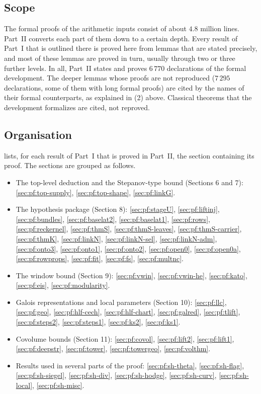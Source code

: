\subsection{Scope}\label{sec:pf:intro:scope}
The formal proofs of the arithmetic inputs consist of about $4.8$ million lines. Part~II converts each part
of them down to a certain depth. Every result of Part~I that is outlined there is proved here from lemmas
that are stated precisely, and most of these lemmas are proved in turn, usually through two or three
further levels. In all, Part~II states and proves $6\,770$ declarations of the formal development. The
deeper lemmas whose proofs are not reproduced ($7\,295$ declarations, some of them with long formal proofs)
are cited by the names of their formal counterparts, as explained in (2) above. Classical
theorems that the development formalizes are cited, not reproved.

\subsection{Organisation}\label{sec:pf:intro:org}
 lists, for each result of Part~I that is proved in Part~II, the section containing its proof.
The sections are grouped as follows.
\begin{itemize}
\item The top-level deduction and the Stepanov-type bound (Sections 6 and 7): \cref{sec:pf:top-supply}, \cref{sec:pf:top-shape}, \cref{sec:pf:linkG}.
\item The hypothesis package (Section 8): \cref{sec:pf:stageU}, \cref{sec:pf:liftinj}, \cref{sec:pf:bundles}, \cref{sec:pf:baselat2}, \cref{sec:pf:baselat1}, \cref{sec:pf:rows}, \cref{sec:pf:reckernel}, \cref{sec:pf:thmS}, \cref{sec:pf:thmS-leaves}, \cref{sec:pf:thmS-carrier}, \cref{sec:pf:thmK}, \cref{sec:pf:linkN}, \cref{sec:pf:linkN-sel}, \cref{sec:pf:linkN-adm}, \cref{sec:pf:onto3}, \cref{sec:pf:onto1}, \cref{sec:pf:onto2}, \cref{sec:pf:open0}, \cref{sec:pf:open0a}, \cref{sec:pf:rowprops}, \cref{sec:pf:fit}, \cref{sec:pf:fs}, \cref{sec:pf:multnc}.
\item The window bound (Section 9): \cref{sec:pf:vwin}, \cref{sec:pf:vwin-he}, \cref{sec:pf:kato}, \cref{sec:pf:eis}, \cref{sec:pf:modularity}.
\item Galois representations and local parameters (Section 10): \cref{sec:pf:llc}, \cref{sec:pf:geo}, \cref{sec:pf:hlf-cech}, \cref{sec:pf:hlf-chart}, \cref{sec:pf:galred}, \cref{sec:pf:tlift}, \cref{sec:pf:steps2}, \cref{sec:pf:steps1}, \cref{sec:pf:ks2}, \cref{sec:pf:ks1}.
\item Covolume bounds (Section 11): \cref{sec:pf:covol}, \cref{sec:pf:lift2}, \cref{sec:pf:lift1}, \cref{sec:pf:deepstr}, \cref{sec:pf:tower}, \cref{sec:pf:towergeo}, \cref{sec:pf:volthm}.
\item Results used in several parts of the proof: \cref{sec:pf:sh-theta}, \cref{sec:pf:sh-flag}, \cref{sec:pf:sh-siegel}, \cref{sec:pf:sh-div}, \cref{sec:pf:sh-hodge}, \cref{sec:pf:sh-curv}, \cref{sec:pf:sh-local}, \cref{sec:pf:sh-misc}.
\end{itemize}


